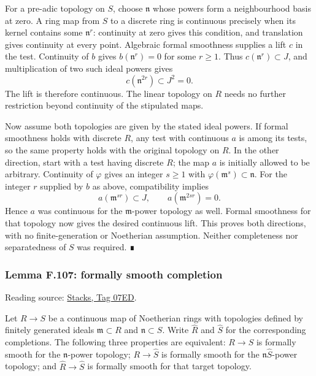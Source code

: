 \documentclass[11pt,a4paper,openany]{report}
\begin{document}
For a pre-adic topology on \(S\), choose \(\mathfrak n\) whose powers form a neighbourhood basis at zero. A ring map from \(S\) to a discrete ring is continuous precisely when its kernel contains some \(\mathfrak n^r\): continuity at zero gives this condition, and translation gives continuity at every point. Algebraic formal smoothness supplies a lift \(c\) in the test. Continuity of \(b\) gives \(b(\mathfrak n^r)=0\) for some \(r\ge1\). Thus \(c(\mathfrak n^r)\subset J\), and multiplication of two such ideal powers gives \[
c(\mathfrak n^{2r})\subset J^2=0.
\] The lift is therefore continuous. The linear topology on \(R\) needs no further restriction beyond continuity of the stipulated maps.

Now assume both topologies are given by the stated ideal powers. If formal smoothness holds with discrete \(R\), any test with continuous \(a\) is among its tests, so the same property holds with the original topology on \(R\). In the other direction, start with a test having discrete \(R\); the map \(a\) is initially allowed to be arbitrary. Continuity of \(\varphi\) gives an integer \(s\ge1\) with \(\varphi(\mathfrak m^s)\subset\mathfrak n\). For the integer \(r\) supplied by \(b\) as above, compatibility implies \[
a(\mathfrak m^{sr})\subset J,
\qquad a(\mathfrak m^{2sr})=0.
\] Hence \(a\) was continuous for the \(\mathfrak m\)-power topology as well. Formal smoothness for that topology now gives the desired continuous lift. This proves both directions, with no finite-generation or Noetherian assumption. Neither completeness nor separatedness of \(S\) was required. ∎

\label{AG-RG-S05-more-algebra-lemma-formally-smooth-completion}

\subsubsection{Lemma F.107: formally smooth completion}\label{AG-RG-S05-lemma-f.107-formally-smooth-completion}

Reading source: \href{https://stacks.math.columbia.edu/tag/07ED}{Stacks, Tag 07ED}.

Let \(R\to S\) be a continuous map of Noetherian rings with topologies defined by finitely generated ideals \(\mathfrak m\subset R\) and \(\mathfrak n\subset S\). Write \(\widehat R\) and \(\widehat S\) for the corresponding completions. The following three properties are equivalent: \(R\to S\) is formally smooth for the \(\mathfrak n\)-power topology; \(R\to\widehat S\) is formally smooth for the \(\mathfrak n\widehat S\)-power topology; and \(\widehat R\to\widehat S\) is formally smooth for that target topology.
\end{document}
